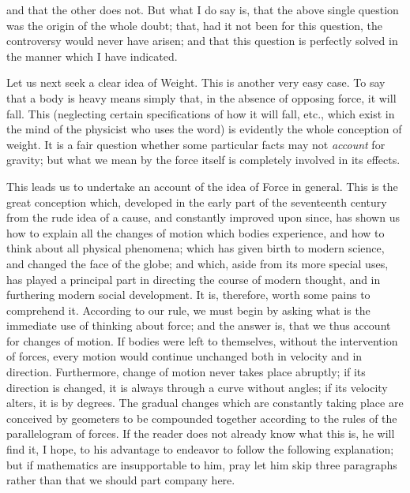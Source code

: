 \documentclass[]{article}
\begin{document}
and that the other does not. But what I do say is, that the above single question was the origin of the whole doubt; that, had it not been for this question, the controversy would never have arisen; and that this question is perfectly solved in the manner which I have indicated. 


Let us next seek a clear idea of Weight. This is another very easy case. To say that a body is heavy means simply that, in the absence of opposing force, it will fall. This (neglecting certain specifications of how it will fall, etc., which exist in the mind of the physicist who uses the word) is evidently the whole conception of weight. It is a fair question whether some particular facts may not \emph{account} for gravity;  but what we mean by the force itself is completely involved in its effects.
 
This leads us to undertake an account of the idea of Force in general. This is the great conception which, developed in the early part of the seventeenth century from the rude idea of a cause, and constantly improved upon since, has shown us how to explain all the changes of motion which bodies experience, and how to think about all physical phenomena; which has given birth to modern science, and changed the face of the globe; and which, aside from its more special uses, has played a principal part in directing the course of modern thought, and in furthering modern social development. It is, therefore, worth some pains to comprehend it. According to our rule, we must begin by asking what is the immediate use of thinking about force; and the answer is, that we thus account for changes of motion. If bodies were left to themselves, without the intervention of forces, every motion would continue unchanged both in velocity and in direction. Furthermore, change of motion never takes place abruptly; if its direction is changed, it is always through a curve without angles; if its velocity alters, it is by degrees. The gradual changes which are constantly taking place are conceived by geometers to be compounded together according to the rules of the parallelogram of forces. If the reader does not already know what this is, he will find it, I hope, to his advantage to endeavor to follow the following explanation; but if mathematics are insupportable to him, pray let him skip three paragraphs rather than that we should part company here.
\end{document}
